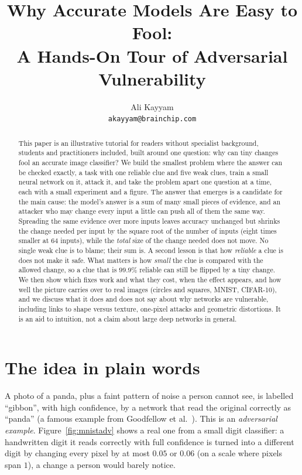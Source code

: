\documentclass[11pt]{article}
\title{Why Accurate Models Are Easy to Fool:\\
A Hands-On Tour of Adversarial Vulnerability}
\author{Ali Kayyam\\
\texttt{akayyam@brainchip.com}}
\date{}
\begin{document}
\sloppy
\maketitle

\begin{abstract}
This paper is an illustrative tutorial for readers without specialist background, students and practitioners included, built around one question: why can tiny changes fool an accurate image classifier? We build the smallest problem where the answer can be checked exactly, a task with one reliable clue and five weak clues, train a small neural network on it, attack it, and take the problem apart one question at a time, each with a small experiment and a figure.
The answer that emerges is a candidate for the main cause: the model's answer is a sum of many small pieces of evidence, and an attacker who may change every input a little can push all of them the same way. Spreading the same evidence over more inputs leaves accuracy unchanged but shrinks the change needed per input by the square root of the number of inputs (eight times smaller at 64 inputs), while the \emph{total} size of the change needed does not move. No single weak clue is to blame; their sum is.
A second lesson is that how \emph{reliable} a clue is does not make it safe. What matters is how \emph{small} the clue is compared with the allowed change, so a clue that is $99.9\%$ reliable can still be flipped by a tiny change.
We then show which fixes work and what they cost, when the effect appears, and how well the picture carries over to real images (circles and squares, MNIST, CIFAR-10), and we discuss what it does and does not say about why networks are vulnerable, including links to shape versus texture, one-pixel attacks and geometric distortions.
It is an aid to intuition, not a claim about large deep networks in general.
\end{abstract}

\section{The idea in plain words}

A photo of a panda, plus a faint pattern of noise a person cannot see, is labelled ``gibbon'', with high confidence, by
a network that read the original correctly as ``panda'' (a famous example from Goodfellow et al.~\cite{goodfellow2015}). This is an \emph{adversarial example}.
Figure~\ref{fig:mnistadv} shows a real one from a small digit classifier: a handwritten digit it reads correctly with full confidence is turned into a different digit by changing
every pixel by at most $0.05$ or $0.06$ (on a scale where pixels span $1$), a change a person would barely notice.
\end{document}

